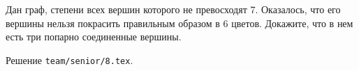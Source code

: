 \problem{}
Дан граф, степени всех вершин которого не превосходят 7.
Оказалось, что его вершины нельзя покрасить правильным образом в 6 цветов.
Докажите, что в нем есть три попарно соединенные вершины.

\solution
Решение \texttt{team/senior/8.tex}.
\endproblem
